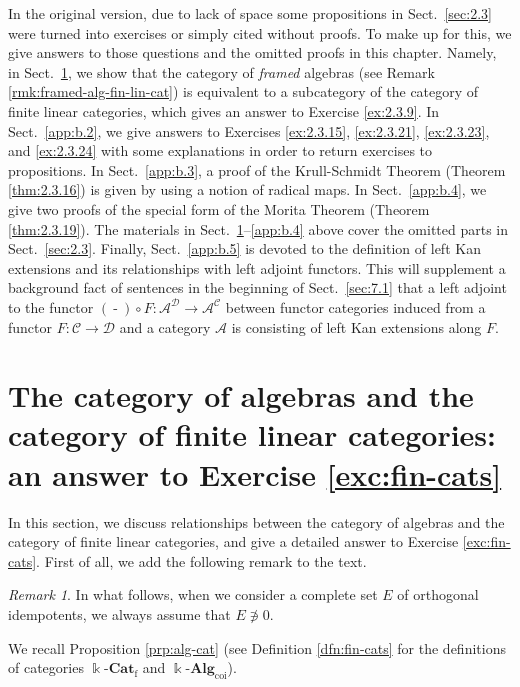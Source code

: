 \documentclass{surv-l}
\numberwithin{equation}{chapter}
\numberwithin{figure}{chapter}
\theoremstyle{plain}
\theoremstyle{definition}
\theoremstyle{remark}
\newtheorem{rmk}[thm]{Remark}
\newcommand{\kCat}{\Bbbk\text{-}\mathbf{Cat}}
\DeclareMathOperator{\blank}{-}
\begin{document}
In the original version, due to lack of space some propositions in Sect.\ \ref{sec:2.3}
were turned into exercises or simply cited without proofs.
To make up for this, we give answers to those questions and the omitted proofs in this chapter.
Namely, in Sect.\ \ref{app:b.1}, we show that the category of {\em framed} algebras
(see Remark \ref{rmk:framed-alg-fin-lin-cat})
is equivalent to a subcategory of the category of finite linear categories,
which gives an answer to Exercise \ref{ex:2.3.9}.
In Sect.\ \ref{app:b.2}, we give answers to Exercises \ref{ex:2.3.15}, \ref{ex:2.3.21}, \ref{ex:2.3.23}, and \ref{ex:2.3.24}
with some explanations in order to return exercises to propositions.
In Sect.\ \ref{app:b.3}, a proof of the Krull-Schmidt Theorem (Theorem \ref{thm:2.3.16}) is given by using a notion of radical maps.
In Sect.\ \ref{app:b.4}, we give two proofs of the special form of the Morita Theorem (Theorem \ref{thm:2.3.19}).
The materials in Sect.\ \ref{app:b.1}--\ref{app:b.4} above cover the omitted parts in Sect.\ \ref{sec:2.3}.
Finally, Sect.\ \ref{app:b.5} is devoted to the definition of left Kan extensions and its relationships with left adjoint functors.
This will supplement a background fact of sentences in the beginning of Sect.\ \ref{sec:7.1} that
a left adjoint to the functor $(\blank) \circ F \colon \mathcal{A}^{{\mathcal{D}}} \to \mathcal{A}^{{\mathcal{C}}}$ between functor categories
induced from a functor $F \colon {\mathcal{C}} \to {\mathcal{D}}$ and a category $\mathcal{A}$
is consisting of left Kan extensions along $F$.

\section[Algebras and finite linear categories]{The category of algebras and the category of finite linear categories:
an answer to Exercise \protect\ref{exc:fin-cats}}\label{app:b.1}

In this section, we discuss relationships between the category of algebras
and the category of finite linear categories,
and give a detailed answer to Exercise \ref{exc:fin-cats}.
First of all, we add the following remark to the text.

\begin{rmk}\label{rmk:nonzero}
In what follows, when we consider a complete set $E$ of orthogonal idempotents,
we always assume that $E \not\ni 0$.
\end{rmk}

We recall Proposition \ref{prp:alg-cat}
(see Definition \ref{dfn:fin-cats} for the definitions of categories $\kCat_{\mathrm{f}}$ and $\Bbbk\text{-}\mathbf{Alg}_{\mathrm{coi}}$).
\end{document}
